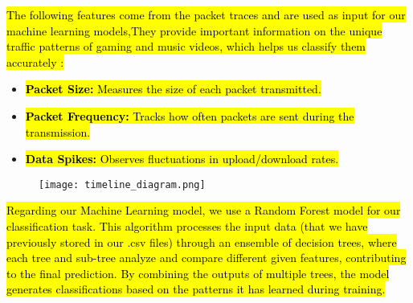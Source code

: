 \hl{The following features come from the packet traces and are used as input for our machine learning models,They provide important information on the unique traffic patterns of gaming and music videos, which helps us classify them accurately :}
\begin{itemize}
    \item \hl{\textbf{Packet Size:} Measures the size of each packet transmitted.}
    \item \hl{\textbf{Packet Frequency:} Tracks how often packets are sent during the transmission.}
    \item \hl{\textbf{Data Spikes:} Observes fluctuations in upload/download rates.}
\end{itemize}

\begin{figure}[ht]
    \centering
    \texttt{[image: timeline\_diagram.png]}
    \label{fig:your_label}
\end{figure}


\hl{Regarding our Machine Learning model, we use a Random Forest model for our classification task. This algorithm processes the input data (that we have previously stored in our .csv files) through an ensemble of decision trees, where each tree and sub-tree analyze and compare different given features, contributing to the final prediction. By combining the outputs of multiple trees, the model generates classifications based on the patterns it has learned during training.
}
\vspace{2mm}

